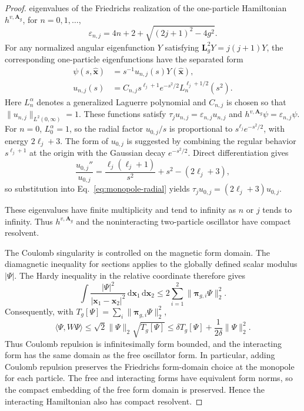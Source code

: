 \documentclass[11pt,a4paper]{article}
\theoremstyle{remark}
\theoremstyle{plain}
\newcommand{\A}{\mathbf A}
\newcommand{\bpi}{\boldsymbol\pi}
\newcommand{\ip}[2]{\langle #1,#2\rangle}
\begin{document}
\begin{proof}
eigenvalues of the Friedrichs realization of the one-particle
Hamiltonian $h^{v,\A_g}$, for $n=0,1,\ldots$,
\begin{equation}
 \varepsilon_{n,j}=4n+2+\sqrt{(2j+1)^2-4g^2}.
 \label{eq:one-particle-spectrum}
\end{equation}
For any normalized angular eigenfunction $Y$ satisfying
$\mathbf L_g^2Y=j(j+1)Y$, the corresponding one-particle eigenfunctions
have the separated form
\begin{equation*}
 \begin{aligned}
 \psi(s,\widehat{\mathbf x})
   &=s^{-1}u_{n,j}(s)Y(\widehat{\mathbf x}),\\
 u_{n,j}(s)
   &=C_{n,j}s^{\ell_j+1}e^{-s^2/2}L_n^{\ell_j+1/2}(s^2).
 \end{aligned}
\end{equation*}
Here $L_n^\alpha$ denotes a generalized Laguerre polynomial and
$C_{n,j}$ is chosen so that $\|u_{n,j}\|_{L^2(0,\infty)}=1$.
These functions satisfy $\tau_j u_{n,j}=\varepsilon_{n,j}u_{n,j}$
and $h^{v,\A_g}\psi=\varepsilon_{n,j}\psi$.
For $n=0$, $L_0^\alpha=1$, so the radial factor $u_{0,j}/s$ is
proportional to $s^{\ell_j}e^{-s^2/2}$, with energy $2\ell_j+3$.
The form of $u_{0,j}$ is suggested by combining the regular behavior
$s^{\ell_j+1}$ at the origin with the Gaussian decay $e^{-s^2/2}$.
Direct differentiation gives
\begin{equation*}
 \frac{u_{0,j}''}{u_{0,j}}
 =\frac{\ell_j(\ell_j+1)}{s^2}+s^2-(2\ell_j+3),
\end{equation*}
so substitution into Eq.~\eqref{eq:monopole-radial} yields
$\tau_j u_{0,j}=(2\ell_j+3)u_{0,j}$.

These eigenvalues have finite
multiplicity and tend to infinity as $n$ or $j$ tends to infinity.
Thus $h^{v,\A_g}$ and the noninteracting two-particle oscillator
have compact resolvent.

The Coulomb singularity is controlled on the magnetic form domain.
The diamagnetic inequality for sections applies to the globally
defined scalar modulus $|\Psi|$. The Hardy inequality in the relative
coordinate therefore gives
\begin{equation}
 \int\frac{|\Psi|^2}{|\mathbf x_1-\mathbf x_2|^2}
    \,\mathrm{d}\mathbf x_1\,\mathrm{d}\mathbf x_2
    \le2\sum_{i=1}^2\|\bpi_{g,i}\Psi\|_2^2.
 \label{eq:Hardy}
\end{equation}
Consequently, with $T_g[\Psi]=\sum_i\|\bpi_{g,i}\Psi\|_2^2$,
\begin{equation}
 \ip{\Psi}{W\Psi}
   \le\sqrt2\|\Psi\|_2\sqrt{T_g[\Psi]}
   \le\delta T_g[\Psi]+\frac1{2\delta}\|\Psi\|_2^2.
\end{equation}
Thus Coulomb repulsion is infinitesimally form bounded, and the
interacting form has the same domain as the free oscillator form.
In particular, adding Coulomb repulsion preserves the Friedrichs
form-domain choice at the monopole for each particle. The free and
interacting forms have equivalent form norms, so the compact
embedding of the free form domain is preserved. Hence the
interacting Hamiltonian also has compact resolvent.
\end{proof}
\end{document}
